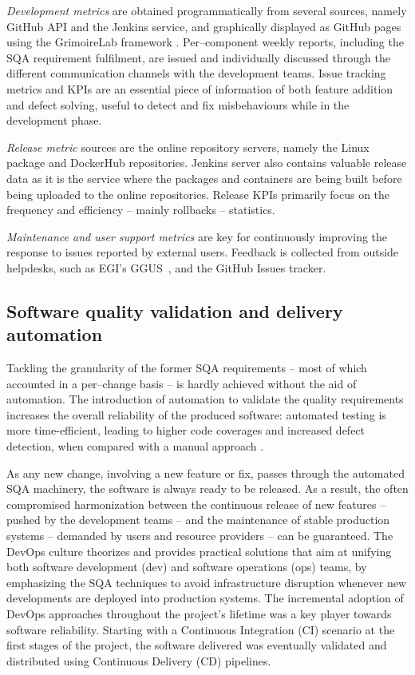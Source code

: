 \documentclass[journal]{IEEEtran}
\begin{document}
\textit{Development metrics} are obtained programmatically from several sources, namely GitHub
API \cite{foot4} and the Jenkins \cite{foot5} service, and graphically displayed as GitHub
pages using the GrimoireLab framework \cite{foot6}.
Per--component weekly reports, including the SQA requirement
fulfilment, are issued and individually discussed through the different communication channels
with the development teams. Issue tracking metrics and KPIs are an essential piece of information
of both feature addition and defect solving, useful to detect and fix misbehaviours while in the
development phase.

\textit{Release metric} sources are the online repository servers, namely the
Linux package \cite{foot7} and DockerHub \cite{foot8} repositories. Jenkins
server also contains valuable release data as it is the service where the packages
and containers are being built before being uploaded to the online repositories. Release
KPIs primarily focus on the frequency and efficiency -- mainly rollbacks -- statistics.

\textit{Maintenance and user support metrics} are key for continuously improving the response
to issues reported by external users. Feedback is collected from outside helpdesks, such as
EGI's GGUS~\cite{ggus}, and the GitHub Issues tracker.

\subsection{Software quality validation and delivery automation}
\label{sec:devops}
Tackling the granularity of the former SQA requirements -- most of which accounted in a per--change basis --
is hardly achieved without the aid of automation. The introduction of automation to validate the quality
requirements increases the overall reliability of the produced software: automated testing is more
time-efficient, leading to higher code coverages and increased defect detection, when compared with a manual
approach \cite{rafi2012}.

As any new change, involving a new feature or fix, passes through the automated
SQA machinery, the software is always ready to be released. As a result, the often compromised harmonization
between the continuous release of new features -- pushed by the development teams -- and the maintenance of
stable production systems -- demanded by users and resource providers -- can be guaranteed. The DevOps culture
theorizes and provides practical solutions that aim at unifying both software development (dev) and software
operations (ops) teams, by emphasizing the SQA techniques to avoid infrastructure disruption whenever new
developments are deployed into production systems.
The incremental adoption of DevOps approaches throughout the project's lifetime was a key player towards
software reliability. Starting with a Continuous Integration (CI) scenario at the first stages of the project, the software delivered
was eventually validated and distributed using Continuous Delivery (CD) pipelines.
\end{document}
